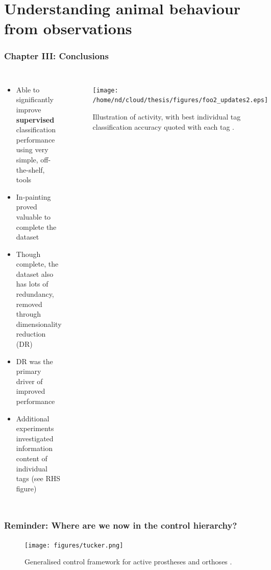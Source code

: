 \documentclass[aspectratio=169]{beamer}
\begin{document}
\section{Understanding animal behaviour from observations} 


\begin{frame}[plain]
    \frametitle{Chapter III: Conclusions}
    \begin{columns}[t] 
        \begin{itemize}
            \item Able to significantly improve {\bf supervised} classification performance using very simple, off-the-shelf, tools 
            \item In-painting proved valuable to complete the dataset
            \item Though complete, the dataset also has lots of redundancy, removed through dimensionality reduction
                (DR)
            \item DR was the primary driver of improved performance
            \item Additional experiments investigated information content of individual tags (see RHS figure)
        \end{itemize}
        \begin{figure}
            \centering
            \texttt{[image: /home/nd/cloud/thesis/figures/foo2\_updates2.eps]}
            \caption{Illustration of activity, with best individual tag classification
accuracy quoted with each tag \citep{dhir2014improved}.}
        \end{figure}
    \end{columns}
\end{frame}


\begin{frame}[plain]
    \frametitle{Reminder: Where are we now in the control hierarchy?}
    \begin{figure}
        \centering
        \texttt{[image: figures/tucker.png]}
        \caption{Generalised control framework for active prostheses and orthoses \citep{tucker2015control}.}
    \end{figure}
\end{frame}
\end{document}
